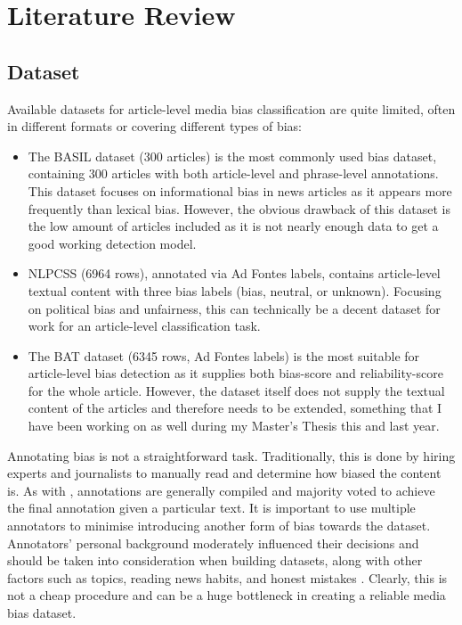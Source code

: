 \chapter{Literature Review}
\label{cha:3}

\section{Dataset}

Available datasets for article-level media bias classification are quite limited, often in different formats or covering different types of bias:
\begin{itemize}
    \item The BASIL dataset \cite{fan-2019-basil} (300 articles) is the most commonly used bias dataset, containing 300 articles with both article-level and phrase-level annotations. This dataset focuses on informational bias in news articles as it appears more frequently than lexical bias. However, the obvious drawback of this dataset is the low amount of articles included as it is not nearly enough data to get a good working detection model.
    \item NLPCSS \cite{chen-2020-nlpcss} (6964 rows), annotated via Ad Fontes labels, contains article-level textual content with three bias labels (bias, neutral, or unknown). Focusing on political bias and unfairness, this can technically be a decent dataset for work for an article-level classification task.
    \item The BAT \cite{spinde-2023-bat} dataset (6345 rows, Ad Fontes labels) is the most suitable for article-level bias detection as it supplies both bias-score and reliability-score for the whole article. However, the dataset itself does not supply the textual content of the articles and therefore needs to be extended, something that I have been working on as well during my Master's Thesis this and last year.
\end{itemize}

Annotating bias is not a straightforward task. Traditionally, this is done by hiring experts and journalists to manually read and determine how biased the content is. As with \cite{spinde-2021-babe}, annotations are generally compiled and majority voted to achieve the final annotation given a particular text. It is important to use multiple annotators to minimise introducing another form of bias towards the dataset. Annotators' personal background moderately influenced their decisions and should be taken into consideration when building datasets, along with other factors such as topics, reading news habits, and honest mistakes \cite{spinde-2021-bias-words}. Clearly, this is not a cheap procedure and can be a huge bottleneck in creating a reliable media bias dataset.

